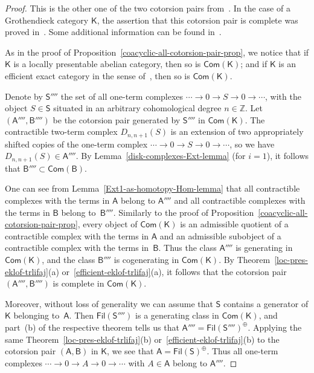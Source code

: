 \documentclass[12pt,a4paper]{amsart}
\newcommand{\+}{\nobreakdash-}
\renewcommand{\:}{\colon}
\newcommand{\rarrow}{\longrightarrow}
\newcommand{\sA}{\mathsf A}
\newcommand{\sB}{\mathsf B}
\newcommand{\sK}{\mathsf K}
\newcommand{\sS}{\mathsf S}
\newcommand{\Com}{\mathsf{Com}}
\newcommand{\Fil}{\mathsf{Fil}}
\newcommand{\boZ}{\mathbb Z}
\theoremstyle{plain}
\theoremstyle{definition}
\begin{document}
\begin{proof}
 This is the other one of the two cotorsion pairs
from~\cite[Proposition~3.6]{Gil}.
 In the case of a Grothendieck category $\sK$, the assertion that this
cotorsion pair is complete was proved in~\cite[Lemma~4.9]{Gil3}.
 Some additional information can be found
in~\cite[Proposition~B.2.6]{Pcosh}.

 As in the proof of Proposition~\ref{coacyclic-all-cotorsion-pair-prop},
we notice that if $\sK$ is a locally presentable abelian category, then
so is $\Com(\sK)$; and if $\sK$ is an efficient exact category in
the sense of~\cite[Definition~3.4]{Sto-ICRA}, then so is $\Com(\sK)$.

 Denote by $\sS''''$ the set of all one-term complexes
$\dotsb\rarrow0\rarrow S\rarrow 0\rarrow\dotsb$, with the object
$S\in\sS$ situated in an arbitrary cohomological degree $n\in\boZ$.
 Let $(\sA'''',\sB'''')$ be the cotorsion pair generated by $\sS''''$
in $\Com(\sK)$.
 The contractible two-term complex $D_{n,n+1}(S)$ is an extension of
two appropriately shifted copies of the one-term complex
$\dotsb\rarrow0\rarrow S\rarrow 0\rarrow\dotsb$, so we have
$D_{n,n+1}(S)\in\sA''''$.
 By Lemma~\ref{disk-complexes-Ext-lemma} (for $i=1$), it follows that
$\sB''''\subset\Com(\sB)$.

 One can see from Lemma~\ref{Ext1-as-homotopy-Hom-lemma} that all
contractible complexes with the terms in $\sA$ belong to $\sA''''$ and
all contractible complexes with the terms in $\sB$ belong to~$\sB''''$.
 Similarly to the proof of
Proposition~\ref{coacyclic-all-cotorsion-pair-prop}, every object of
$\Com(\sK)$ is an admissible quotient of a contractible complex with
the terms in $\sA$ and an admissible subobject of a contractible
complex with the terms in~$\sB$.
 Thus the class $\sA''''$ is generating in $\Com(\sK)$, and the class
$\sB''''$ is cogenerating in $\Com(\sK)$.
 By Theorem~\ref{loc-pres-eklof-trlifaj}(a)
or~\ref{efficient-eklof-trlifaj}(a), it follows that the cotorsion pair
$(\sA'''',\sB'''')$ is complete in $\Com(\sK)$.

 Moreover, without loss of generality we can assume that $\sS$ contains
a generator of $\sK$ belonging to~$\sA$.
 Then $\Fil(\sS'''')$ is a generating class in $\Com(\sK)$, and
part~(b) of the respective theorem tells us that
$\sA''''=\Fil(\sS'''')^\oplus$.
 Applying the same Theorem~\ref{loc-pres-eklof-trlifaj}(b)
or~\ref{efficient-eklof-trlifaj}(b) to the cotorsion pair $(\sA,\sB)$
in $\sK$, we see that $\sA=\Fil(\sS)^\oplus$.
 Thus all one-term complexes $\dotsb\rarrow0\rarrow A\rarrow 0\rarrow
\dotsb$ with $A\in\sA$ belong to $\sA''''$.


\end{proof}
\end{document}
